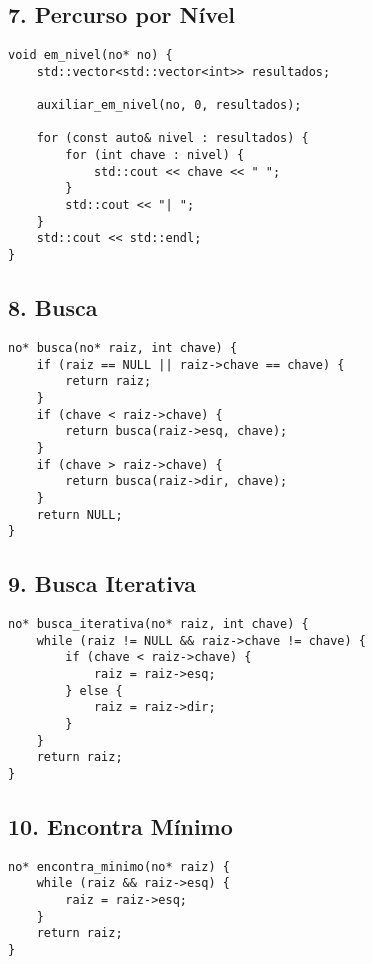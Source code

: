 \documentclass[a4paper,12pt]{article}
\begin{document}
\subsection*{7. Percurso por Nível}
\begin{verbatim}
void em_nivel(no* no) {
    std::vector<std::vector<int>> resultados;

    auxiliar_em_nivel(no, 0, resultados);

    for (const auto& nivel : resultados) {
        for (int chave : nivel) {
            std::cout << chave << " ";
        }
        std::cout << "| ";
    }
    std::cout << std::endl;
}
\end{verbatim}

\subsection*{8. Busca}
\begin{verbatim}
no* busca(no* raiz, int chave) {
    if (raiz == NULL || raiz->chave == chave) {
        return raiz;
    }
    if (chave < raiz->chave) {
        return busca(raiz->esq, chave);
    }
    if (chave > raiz->chave) {
        return busca(raiz->dir, chave);
    }
    return NULL;
}
\end{verbatim}

\subsection*{9. Busca Iterativa}
\begin{verbatim}
no* busca_iterativa(no* raiz, int chave) {
    while (raiz != NULL && raiz->chave != chave) {
        if (chave < raiz->chave) {
            raiz = raiz->esq;
        } else {
            raiz = raiz->dir;
        }
    }
    return raiz;
}
\end{verbatim}

\subsection*{10. Encontra Mínimo}
\begin{verbatim}
no* encontra_minimo(no* raiz) {
    while (raiz && raiz->esq) {
        raiz = raiz->esq;
    }
    return raiz;
}
\end{verbatim}
\end{document}
